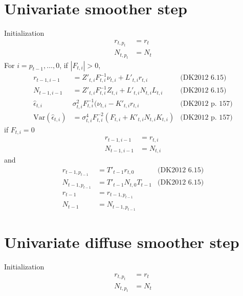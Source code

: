 \documentclass{article}
\begin{document}
\section{Univariate smoother step}
Initialization
\begin{align*}
  r_{t, p_t} &= r_t \\
  N_{t,p_t} &= N_t
\end{align*}
For $i = p_{t-1},\ldots,0$, if $|F_{t,i}| > 0$,
\begin{align*}
  r_{t-1,i-1} &= Z'_{t,i}F^{-1}_{t,i}\nu_{t,i} + L'_{t,i}r_{t,i} & \mbox{(DK2012 6.15)}\\
  N_{t-1,i-1} &= Z'_{t,i}F^{-1}_{t,i}Z_{t,i} + L'_{t,i}N_{t,i}L_{t,i} & \mbox{(DK2012 6.15)}\\
  \hat\epsilon_{t,i} & \sigma^2_{t,i}F^{-1}_{t,i}(\nu_{t,i} -
                       K'_{t,i}r_{t,i} & \mbox{(DK2012 p. 157)}\\
  \mbox{Var}(\hat\epsilon_{t,i}) &= \sigma^4_{t,i}F^{-2}_{t,i}(F_{t,i}
                                   + K'_{t,i}N_{t,i}K_{t,i}) & \mbox{(DK2012 p. 157)} 
\end{align*}
if $F_{t,i} = 0$
\begin{align*}
  r_{t-1,i-1} &= r_{t,i} \\
  N_{t-1,i-1} &= N_{t,i}
\end{align*}
and
\begin{align*}
  r_{t-1,p_{t-1}} &= T'_{t-1}r_{t,0} & \mbox{(DK2012 6.15)}\\
  N_{t-1,p_{t-1}} &= T'_{t-1}N_{t,0}T_{t-1}  & \mbox{(DK2012 6.15)}\\
  r_{t-1} &= r_{t-1, p_{t-1}}\\
  N_{t-1} &= N_{t-1, p_{t-1}}
\end{align*}

\section{Univariate diffuse smoother step}
Initialization
\begin{align*}
  r_{t, p_t} &= r_t \\
  N_{t,p_t} &= N_t
\end{align*}
\end{document}
